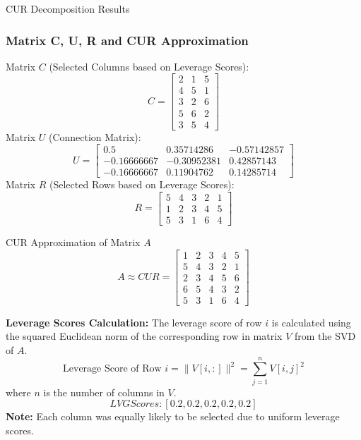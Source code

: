 \documentclass[pdf]{beamer}
\begin{document}
\begin{frame}{CUR Decomposition Results}
    \frametitle{Matrix C, U, R and CUR Approximation}
    Matrix \( C \) (Selected Columns based on Leverage Scores):
    \[
    C = \begin{bmatrix} 2 & 1 & 5 \\ 4 & 5 & 1 \\ 3 & 2 & 6 \\ 5 & 6 & 2 \\ 3 & 5 & 4 \end{bmatrix}
    \]
    Matrix \( U \) (Connection Matrix):
    \[
    U = \begin{bmatrix} 0.5 & 0.35714286 & -0.57142857 \\ -0.16666667 & -0.30952381 & 0.42857143 \\ -0.16666667 & 0.11904762 & 0.14285714 \end{bmatrix}
    \]
    Matrix \( R \) (Selected Rows based on Leverage Scores):
    \[
    R = \begin{bmatrix} 5 & 4 & 3 & 2 & 1 \\ 1 & 2 & 3 & 4 & 5 \\ 5 & 3 & 1 & 6 & 4 \end{bmatrix}
    \]
\end{frame}

\begin{frame}{CUR Approximation of Matrix \( A \)}
    \[
    A \approx CUR = \begin{bmatrix} 1 & 2 & 3 & 4 & 5 \\ 5 & 4 & 3 & 2 & 1 \\ 2 & 3 & 4 & 5 & 6 \\ 6 & 5 & 4 & 3 & 2 \\ 5 & 3 & 1 & 6 & 4 \end{bmatrix}
    \]

    \textbf{Leverage Scores Calculation:}
    The leverage score of row \( i \) is calculated using the squared Euclidean norm of the corresponding row in matrix \( V \) from the SVD of \( A \).
    \[
    \text{Leverage Score of Row } i = \| V[i, :] \|^2 = \sum_{j=1}^{n} V[i, j]^2
    \]
    where \( n \) is the number of columns in \( V \). 
    \[
    LVG Scores: [0.2, 0.2, 0.2, 0.2, 0.2]
    \]
    \textbf{Note:} Each column was equally likely to be selected due to uniform leverage scores.
\end{frame}
\end{document}
